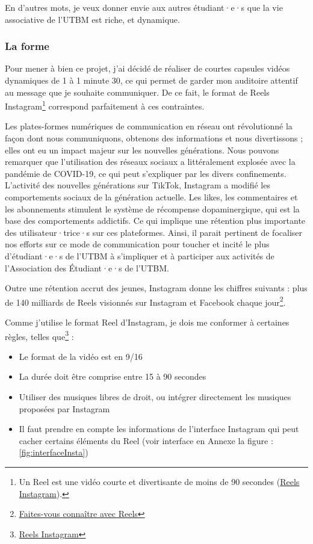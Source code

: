 En d'autres mots, je veux donner envie aux autres étudiant·e·s que la vie associative de l'\gls{UTBM} est riche, et dynamique.

\subsubsection{La forme}

Pour mener à bien ce projet, j'ai décidé de réaliser de courtes capsules vidéos dynamiques de 1 à 1 minute 30, ce qui permet de garder mon auditoire attentif au message que je souhaite communiquer.
De ce fait, le format de Reels Instagram\footnote{Un Reel est une vidéo courte et divertisante de moins de 90 secondes (\href{https://about.instagram.com/fr-fr/features/reels}{Reels Instagram}).} correspond parfaitement à ces contraintes.

Les plates-formes numériques de communication en réseau ont révolutionné la façon dont nous communiquons, obtenons des informations et nous divertissons ; elles ont eu un impact majeur sur les nouvelles générations.
Nous pouvons remarquer que l'utilisation des réseaux sociaux a littéralement explosée avec la pandémie de COVID-19, ce qui peut s'expliquer par les divers confinements.
L'activité des nouvelles générations sur TikTok, Instagram a modifié les comportements sociaux de la génération actuelle.
Les likes, les commentaires et les abonnements stimulent le système de récompense dopaminergique, qui est la base des comportements addictifs\cite{pedrouzo2023hyperconnected}.
Ce qui implique une rétention plus importante des utilisateur·trice·s sur ces plateformes.
Ainsi, il parait pertinent de focaliser nos efforts sur ce mode de communication pour toucher et incité le plus d'étudiant·e·s de l'\gls{UTBM} à s'impliquer et à participer aux activités de l'Association des Étudiant·e·s de l'\gls{UTBM}.

Outre une rétention accrut des jeunes, Instagram donne les chiffres suivants : plus de 140 milliards de Reels visionnés sur Instagram et Facebook chaque jour\footnote{\href{https://business.instagram.com/instagram-reels?locale=fr_FR}{Faites-vous connaître avec Reels}}.

Comme j'utilise le format Reel d'Instagram, je dois me conformer à certaines règles, telles que\footnote{\href{https://about.instagram.com/fr-fr/features/reels}{Reels Instagram}} :
\begin{itemize}
    \item Le format de la vidéo est en 9/16
    \item La durée doit être comprise entre 15 à 90 secondes
    \item Utiliser des musiques libres de droit, ou intégrer directement les musiques proposées par Instagram
    \item Il faut prendre en compte les informations de l'interface Instagram qui peut cacher certains éléments du Reel (voir interface en Annexe la figure : \ref{fig:interfaceInsta})
\end{itemize}


